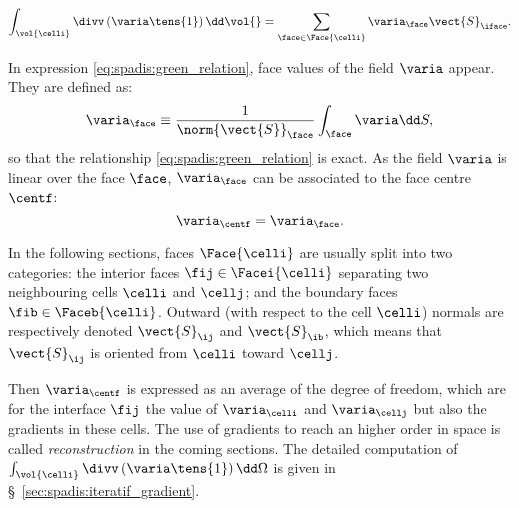 \begin{equation}\label{eq:spadis:green_relation}
\int_{\vol{\celli}} \divv \left( \varia \tens{1}\right) \dd \vol{} =  \sum\limits_{\face \in \Face{\celli}} \varia_{\face}\vect{S}_{\iface}.
\end{equation}

In expression \eqref{eq:spadis:green_relation}, face values of the field $\varia$ appear. They are defined as:
\begin{equation}\label{eq:spadis:variaf_def}
\varia_\face \equiv \dfrac{1}{\norm{\vect{S}}_\face} \int_{\face} \varia \dd S,
\end{equation}
%
so that the relationship \eqref{eq:spadis:green_relation} is exact. As the field $\varia$ is linear over the face $\face$,  
$\varia_\face$ can be associated to the face centre $\centf$:
\begin{equation}\label{eq:spadis:variaf_id}
\varia_\centf = \varia_\face.
\end{equation}

In the following sections, faces $\Face{\celli}$ are usually split into two categories: the interior faces $\fij \in \Facei{\celli}$ separating
two neighbouring cells $\celli$ and $\cellj$; and the boundary faces $\fib \in \Faceb{\celli}$. 
Outward (with respect to the cell $\celli$) normals are respectively denoted  $\vect{S}_\ij$ and $\vect{S}_\ib$, 
which means that $\vect{S}_\ij$ is oriented from $\celli$ toward $\cellj$. 

Then $\varia_{\centf}$ is expressed as an average of the degree of freedom, which are for the interface $\fij$ the value of $\varia_\celli$ 
and $\varia_\cellj$ but also the gradients in these cells. The use of gradients to reach an higher order in space is called \emph{reconstruction} 
in the coming sections. The detailed computation of $\int_{\vol{\celli}} \divv \left( \varia \tens{1}\right) \dd \Omega $ is given in
 \S~\ref{sec:spadis:iteratif_gradient}. 
%
 

